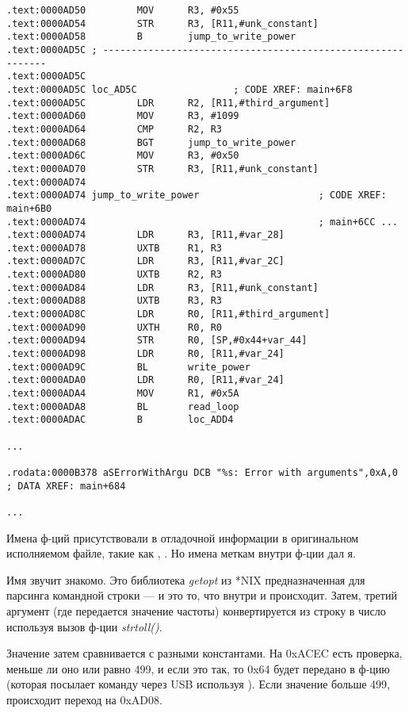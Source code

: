 \begin{lstlisting}[style=customasmARM]
.text:0000AD50         MOV      R3, #0x55
.text:0000AD54         STR      R3, [R11,#unk_constant]
.text:0000AD58         B        jump_to_write_power
.text:0000AD5C ; ------------------------------------------------------------
.text:0000AD5C
.text:0000AD5C loc_AD5C                 ; CODE XREF: main+6F8
.text:0000AD5C         LDR      R2, [R11,#third_argument]
.text:0000AD60         MOV      R3, #1099
.text:0000AD64         CMP      R2, R3
.text:0000AD68         BGT      jump_to_write_power
.text:0000AD6C         MOV      R3, #0x50
.text:0000AD70         STR      R3, [R11,#unk_constant]
.text:0000AD74
.text:0000AD74 jump_to_write_power                     ; CODE XREF: main+6B0
.text:0000AD74                                         ; main+6CC ...
.text:0000AD74         LDR      R3, [R11,#var_28]
.text:0000AD78         UXTB     R1, R3
.text:0000AD7C         LDR      R3, [R11,#var_2C]
.text:0000AD80         UXTB     R2, R3
.text:0000AD84         LDR      R3, [R11,#unk_constant]
.text:0000AD88         UXTB     R3, R3
.text:0000AD8C         LDR      R0, [R11,#third_argument]
.text:0000AD90         UXTH     R0, R0
.text:0000AD94         STR      R0, [SP,#0x44+var_44]
.text:0000AD98         LDR      R0, [R11,#var_24]
.text:0000AD9C         BL       write_power
.text:0000ADA0         LDR      R0, [R11,#var_24]
.text:0000ADA4         MOV      R1, #0x5A
.text:0000ADA8         BL       read_loop
.text:0000ADAC         B        loc_ADD4

...

.rodata:0000B378 aSErrorWithArgu DCB "%s: Error with arguments",0xA,0 ; DATA XREF: main+684

...

\end{lstlisting}

Имена ф-ций присутствовали в отладочной информации в оригинальном исполняемом файле,
такие как , .
Но имена меткам внутри ф-ции дал я.

Имя  звучит знакомо. Это библиотека \emph{getopt} из *NIX предназначенная для парсинга командной строки ---
и это то, что внутри и происходит.
Затем, третий аргумент (где передается значение частоты) конвертируется из строку в число используя вызов ф-ции \emph{strtoll()}.

Значение затем сравнивается с разными константами.
На 0xACEC есть проверка, меньше ли оно или равно 499, и если это так, то 0x64 будет передано в ф-цию
 (которая посылает команду через USB используя ).
Если значение больше 499, происходит переход на 0xAD08.

